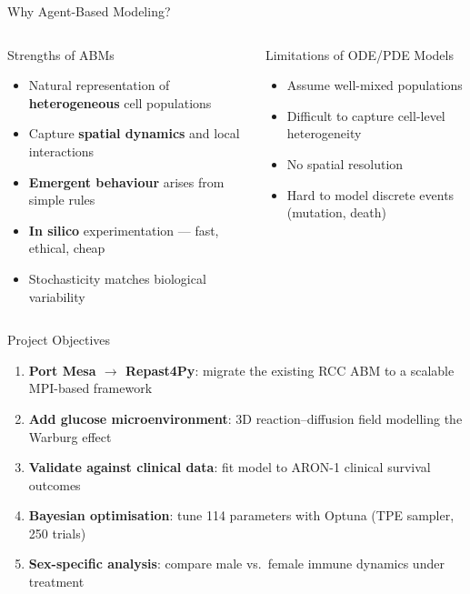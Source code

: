 \documentclass[aspectratio=169,10pt]{beamer}
\begin{document}
\begin{frame}{Why Agent-Based Modeling?}
  \begin{columns}[T]
    \begin{block}{Strengths of ABMs}
      \begin{itemize}
        \item Natural representation of \textbf{heterogeneous} cell populations
        \item Capture \textbf{spatial dynamics} and local interactions
        \item \textbf{Emergent behaviour} arises from simple rules
        \item \textbf{In silico} experimentation --- fast, ethical, cheap
        \item Stochasticity matches biological variability
      \end{itemize}
    \end{block}

    \begin{block}{Limitations of ODE/PDE Models}
      \begin{itemize}
        \item Assume well-mixed populations
        \item Difficult to capture cell-level heterogeneity
        \item No spatial resolution
        \item Hard to model discrete events (mutation, death)
      \end{itemize}
    \end{block}
  \end{columns}
\end{frame}

\begin{frame}{Project Objectives}
  \begin{enumerate}
    \item \textbf{Port Mesa $\rightarrow$ Repast4Py}: migrate the existing RCC ABM to a scalable MPI-based framework
    \item \textbf{Add glucose microenvironment}: 3D reaction--diffusion field modelling the Warburg effect
    \item \textbf{Validate against clinical data}: fit model to ARON-1 clinical survival outcomes
    \item \textbf{Bayesian optimisation}: tune 114 parameters with Optuna (TPE sampler, 250 trials)
    \item \textbf{Sex-specific analysis}: compare male vs.\ female immune dynamics under treatment
  \end{enumerate}
\end{frame}
\end{document}
